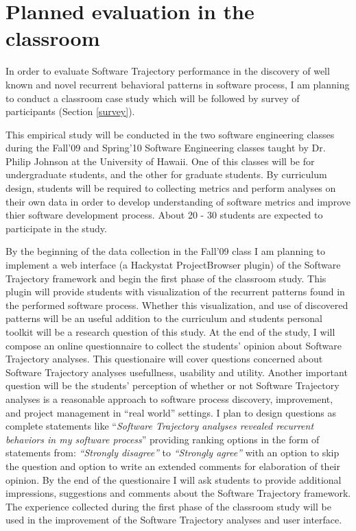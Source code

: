 \section{Planned evaluation in the classroom}\label{classroom}
In order to evaluate Software Trajectory performance in the discovery of well known and novel recurrent behavioral patterns in software process, I am planning to conduct a classroom case study which will be followed by survey of participants (Section \ref{survey}). 

This empirical study will be conducted in the two software engineering classes during the Fall'09 and Spring'10 Software Engineering classes taught by Dr. Philip Johnson at the University of Hawaii. One of this classes will be for undergraduate students, and the other for graduate students. By curriculum design, students will be required to collecting metrics and perform analyses on their own data in order to develop understanding of software metrics and improve thier software development process. About 20 - 30 students are expected to participate in the study. 

By the beginning of the data collection in the Fall'09 class I am planning to implement a web interface (a Hackystat ProjectBrowser plugin) of the Software Trajectory framework and begin the first phase of the classroom study. This plugin will provide students with visualization of the recurrent patterns found in  the performed software process. Whether this visualization, and use of discovered patterns will be an useful addition to the curriculum and students personal toolkit will be a research question of this study. At the end of the study, I will compose an online questionnaire to collect the students' opinion about Software Trajectory analyses. This questionaire will cover questions concerned about Software Trajectory analyses usefullness, usability and utility. Another important question will be the students' perception of whether or not Software Trajectory analyses is a reasonable approach to software process discovery, improvement, and project management in ``real world'' settings. I plan to design questions as complete statements like ``\textit{Software Trajectory analyses revealed recurrent behaviors in my software process}'' providing ranking options in the form of statements from: \textit{``Strongly disagree''} to \textit{``Strongly agree''} with an option to skip the question and option to write an extended comments for elaboration of their opinion. By the end of the questionaire I will ask students to provide additional impressions, suggestions and comments about the Software Trajectory framework. The experience collected during the first phase of the classroom study will be used in the improvement of the Software Trajectory analyses and user interface.

